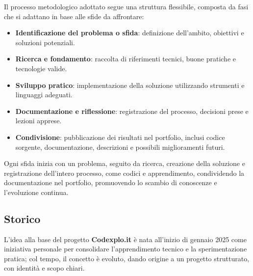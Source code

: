 \documentclass[10pt, a4paper, oneside]{article}
\begin{document}
Il processo metodologico adottato segue una struttura flessibile, composta da fasi che si adattano in base alle sfide da affrontare:

\begin{itemize}
  \item \textbf{Identificazione del problema o sfida}: definizione dell’ambito, obiettivi e soluzioni potenziali.
  \item \textbf{Ricerca e fondamento}: raccolta di riferimenti tecnici, buone pratiche e tecnologie valide.
  \item \textbf{Sviluppo pratico}: implementazione della soluzione utilizzando strumenti e linguaggi adeguati.
  \item \textbf{Documentazione e riflessione}: registrazione del processo, decisioni prese e lezioni apprese.
  \item \textbf{Condivisione}: pubblicazione dei risultati nel portfolio, inclusi codice sorgente, documentazione, descrizioni e possibili miglioramenti futuri.
\end{itemize}

Ogni sfida inizia con un problema, seguito da ricerca, creazione della soluzione e registrazione dell’intero processo, come codici e apprendimento, condividendo la documentazione nel portfolio, promuovendo lo scambio di conoscenze e l’evoluzione continua.

\subsection{Storico}

L’idea alla base del progetto \textbf{Codexplo.it} è nata all’inizio di gennaio 2025 come iniziativa personale per consolidare l’apprendimento tecnico e la sperimentazione pratica; col tempo, il concetto è evoluto, dando origine a un progetto strutturato, con identità e scopo chiari.
\end{document}
